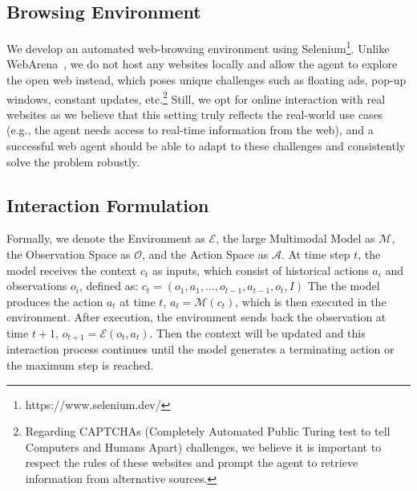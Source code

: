 \documentclass[11pt]{article}
\newcommand{\kaixin}[2][]{\todo[color=green,size=\scriptsize,fancyline,caption={},#1]{KM:#2}}
\newcommand{\dai}[2][]{\todo[color=cyan,size=\scriptsize,fancyline,caption={},#1]{DAI:#2}}
\begin{document}
\subsection{Browsing Environment}
We develop an automated web-browsing environment using Selenium\footnote{https://www.selenium.dev/}. 
Unlike WebArena~\cite{zhou2023webarena}, we do not host any websites locally and allow the agent to explore the open web instead, which poses unique challenges such as floating ads, pop-up windows, constant updates, etc.\footnote{Regarding CAPTCHAs (Completely Automated Public Turing test to tell Computers and Humans Apart) challenges, we believe it is important to respect the rules of these websites and prompt the agent to retrieve information from alternative sources.} Still, we opt for online interaction with real websites as we believe that this setting truly reflects the real-world use cases (e.g., the agent needs access to real-time information from the web), and a successful web agent should be able to adapt to these challenges and consistently solve the problem robustly. 



\subsection{Interaction Formulation}\label{subsec:planning_method}

Formally, we denote the Environment as \(\mathcal{E}\), the large Multimodal Model as \(\mathcal{M}\), the Observation Space as \(\mathcal{O}\), and the Action Space as \(\mathcal{A}\). At time step $t$, the model receives the context $c_t$ as inputs, 
which consist of historical actions $a_i$ and observations $o_i$, defined as: $c_t = (o_1, a_1, ..., o_{t-1}, a_{t-1}, o_t, I)$ %
The the model produces the action $a_t$ at time 
$t$,
$a_t = \mathcal{M}(c_t)$, which is then executed in the environment. After execution, the environment sends back the observation at time $t+1$, $o_{t+1} = \mathcal{E}(o_t, a_t)$. Then the context will be updated and this interaction process continues until the model generates a terminating action or the maximum step is reached. 
\end{document}

